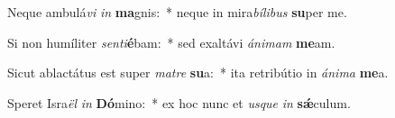 \item Neque ambulá\textit{vi} \textit{in} \textbf{ma}gnis:~* neque in mira\textit{bí}\textit{li}\textit{bus} \textbf{su}per me.
\item Si non humíliter \textit{sen}\textit{ti}\textbf{é}bam:~* sed exaltávi \textit{á}\textit{ni}\textit{mam} \textbf{me}am.
\item Sicut ablactátus est super \textit{ma}\textit{tre} \textbf{su}a:~* ita retribútio in \textit{á}\textit{ni}\textit{ma} \textbf{me}a.
\item Speret Isra\textit{ël} \textit{in} \textbf{Dó}mino:~* ex hoc nunc et \textit{us}\textit{que} \textit{in} \textbf{sǽ}culum.
